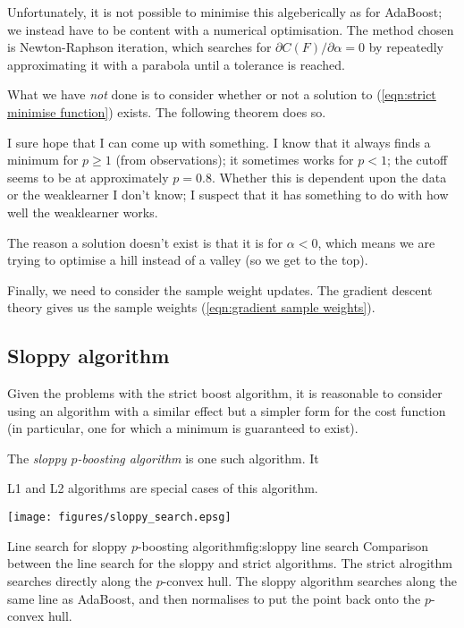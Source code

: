 Unfortunately, it is not possible to minimise this algeberically as
for AdaBoost; we instead have to be content with a numerical
optimisation.  The method chosen is Newton-Raphson iteration, which
searches for $\partial C(F) / \partial \alpha = 0$ by repeatedly
approximating it with a parabola until a tolerance is reached.

What we have \emph{not} done is to consider whether or not a solution
to (\ref{eqn:strict minimise function}) exists.  The following theorem
does so.

\begin{theorem}
I sure hope that I can come up with something.  I know that it always
finds a minimum for $p \geq 1$ (from observations); it sometimes works
for $p < 1$; the cutoff seems to be at approximately $p = 0.8$.
Whether this is dependent upon the data or the weaklearner I don't
know; I suspect that it has something to do with how well the
weaklearner works.

The reason a solution doesn't exist is that it is for $\alpha < 0$,
which means we are trying to optimise a hill instead of a valley (so
we get to the top).
\end{theorem}

Finally, we need to consider the sample weight updates.  The gradient
descent theory gives us the sample weights (\ref{eqn:gradient sample
weights}).

\subsection{Sloppy algorithm}

Given the problems with the strict boost algorithm, it is reasonable
to consider using an algorithm with a similar effect but a simpler
form for the cost function (in particular, one for which a minimum is
guaranteed to exist).

The \emph{sloppy $p$-boosting algorithm} is one such algorithm.  It 

L1 and L2 algorithms are special cases of this algorithm.

\begin{linefigure}
\begin{center}
\texttt{[image: figures/sloppy\_search.epsg]}
\end{center}
\begin{capt}{Line search for sloppy $p$-boosting algorithm}{fig:sloppy line search}
Comparison between the line search for the sloppy and strict
algorithms.  The strict alrogithm searches directly along the
$p$-convex hull.  The sloppy algorithm searches along the same line as
AdaBoost, and then normalises to put the point back onto the
$p$-convex hull.
\end{capt}
\end{linefigure}


